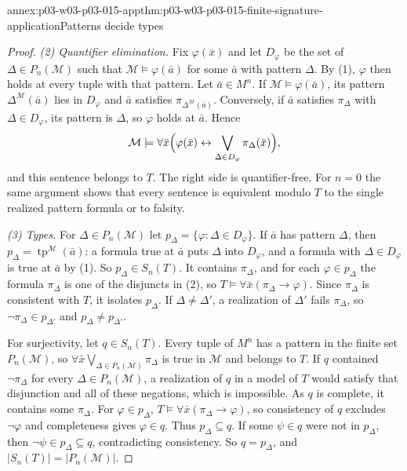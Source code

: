 \begin{annexitem}{annex:p03-w03-p03-015-app}{thm:p03-w03-p03-015-finite-signature-application}{Patterns decide types}
\begin{proof}
\emph{(2) Quantifier elimination.} Fix \(\varphi(\bar x)\) and let
\(D_\varphi\) be the set of \(\Delta\in P_n(\mathcal M)\) such that
\(\mathcal M\models\varphi(\bar a)\) for some \(\bar a\) with pattern
\(\Delta\). By (1), \(\varphi\) then holds at every tuple with that
pattern. Let \(\bar a\in M^n\). If \(\mathcal M\models\varphi(\bar a)\),
its pattern \(\Delta^{\mathcal M}(\bar a)\) lies in \(D_\varphi\) and
\(\bar a\) satisfies \(\pi_{\Delta^{\mathcal M}(\bar a)}\). Conversely, if
\(\bar a\) satisfies \(\pi_\Delta\) with \(\Delta\in D_\varphi\), its
pattern is \(\Delta\), so \(\varphi\) holds at \(\bar a\). Hence
\[
 \mathcal M\models\forall\bar x\Bigl(\varphi(\bar x)\leftrightarrow
       \bigvee_{\Delta\in D_\varphi}\pi_\Delta(\bar x)\Bigr),
\]
and this sentence belongs to \(T\). The right side is quantifier-free.
For \(n=0\) the same argument shows that every sentence is equivalent
modulo \(T\) to the single realized pattern formula or to falsity.

\emph{(3) Types.} For \(\Delta\in P_n(\mathcal M)\) let
\(p_\Delta=\{\varphi:\Delta\in D_\varphi\}\). If \(\bar a\) has pattern
\(\Delta\), then \(p_\Delta=\operatorname{tp}^{\mathcal M}(\bar a)\): a
formula true at \(\bar a\) puts \(\Delta\) into \(D_\varphi\), and a
formula with \(\Delta\in D_\varphi\) is true at \(\bar a\) by (1).
So \(p_\Delta\in S_n(T)\). It contains \(\pi_\Delta\), and for each
\(\varphi\in p_\Delta\) the formula \(\pi_\Delta\) is one of the disjuncts
in (2), so \(T\models\forall\bar x(\pi_\Delta\to\varphi)\). Since
\(\pi_\Delta\) is consistent with \(T\), it isolates \(p_\Delta\).
If \(\Delta\neq\Delta'\), a realization of \(\Delta'\) fails
\(\pi_\Delta\), so \(\neg\pi_\Delta\in p_{\Delta'}\) and
\(p_\Delta\neq p_{\Delta'}\).

For surjectivity, let \(q\in S_n(T)\). Every tuple of \(M^n\) has a
pattern in the finite set \(P_n(\mathcal M)\), so
\(\forall\bar x\bigvee_{\Delta\in P_n(\mathcal M)}\pi_\Delta\) is true in
\(\mathcal M\) and belongs to \(T\). If \(q\) contained \(\neg\pi_\Delta\)
for every \(\Delta\in P_n(\mathcal M)\), a realization of \(q\) in a model
of \(T\) would satisfy that disjunction and all of these negations, which
is impossible. As \(q\) is complete, it contains some \(\pi_\Delta\). For
\(\varphi\in p_\Delta\), \(T\models\forall\bar x(\pi_\Delta\to\varphi)\),
so consistency of \(q\) excludes \(\neg\varphi\) and completeness gives
\(\varphi\in q\). Thus \(p_\Delta\subseteq q\). If some \(\psi\in q\)
were not in \(p_\Delta\), then \(\neg\psi\in p_\Delta\subseteq q\),
contradicting consistency. So \(q=p_\Delta\), and
\(|S_n(T)|=|P_n(\mathcal M)|\).


\end{proof}
\end{annexitem}
